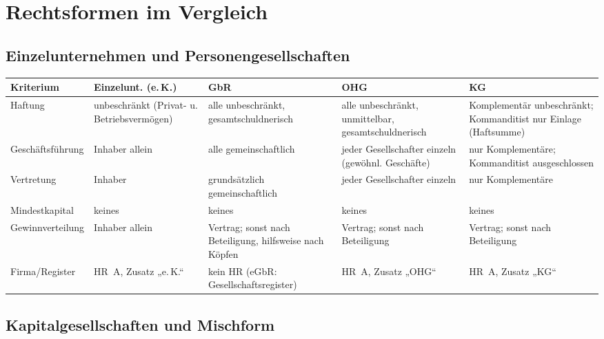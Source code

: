 \documentclass[11pt, a4paper]{article}
\begin{document}
\section{Rechtsformen im Vergleich}

\subsection{Einzelunternehmen und Personengesellschaften}

\begin{center}
\small
\begin{tabular}{p{2.6cm} p{2.9cm} p{2.7cm} p{2.9cm} p{2.9cm}}
\toprule
\textbf{Kriterium} & \textbf{Einzelunt. (e.\,K.)} & \textbf{GbR} & \textbf{OHG} & \textbf{KG}\\
\midrule
Haftung & unbeschränkt (Privat- u. Betriebsvermögen) & alle unbeschränkt, gesamtschuldnerisch & alle unbeschränkt, unmittelbar, gesamtschuldnerisch & Komplementär unbeschränkt; Kommanditist nur Einlage (Haftsumme)\\
\addlinespace
Geschäftsführung & Inhaber allein & alle gemeinschaftlich & jeder Gesellschafter einzeln (gewöhnl. Geschäfte) & nur Komplementäre; Kommanditist ausgeschlossen\\
\addlinespace
Vertretung & Inhaber & grundsätzlich gemeinschaftlich & jeder Gesellschafter einzeln & nur Komplementäre\\
\addlinespace
Mindestkapital & keines & keines & keines & keines\\
\addlinespace
Gewinnverteilung & Inhaber allein & Vertrag; sonst nach Beteiligung, hilfsweise nach Köpfen & Vertrag; sonst nach Beteiligung & Vertrag; sonst nach Beteiligung\\
\addlinespace
Firma/Register & HR~A, Zusatz „e.\,K.`` & kein HR (eGbR: Gesellschaftsregister) & HR~A, Zusatz „OHG`` & HR~A, Zusatz „KG``\\
\bottomrule
\end{tabular}
\end{center}

\subsection{Kapitalgesellschaften und Mischform}
\end{document}
